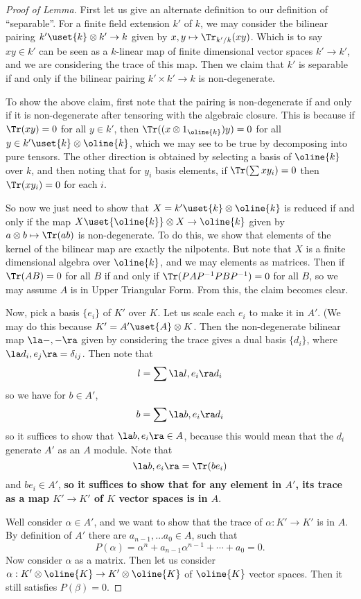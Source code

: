 \documentclass[12 pt]{article}
\theoremstyle{definition}
\renewcommand{\(}{\left(}
\renewcommand{\)}{\right)}
\begin{document}
\begin{proof}[Proof of Lemma]

First let us give an alternate definition to our definition of ``separable''. For a finite field extension $k'$ of $k$, we may consider the bilinear pairing $k' \uset{k}\otimes k' \to k$ given by $x,y \mapsto \Tr_{k'/k}(xy)$. Which is to say $xy \in k'$ can be seen as a $k$-linear map of finite dimensional vector spaces $k' \to k'$, and we are considering the trace of this map. Then we claim that $k'$ is separable if and only if the bilinear pairing $k' \times k' \to k$ is non-degenerate.

To show the above claim, first note that the pairing is non-degenerate if and only if it is non-degenerate after tensoring with the algebraic closure. This is because if $\Tr(xy)=0$ for all $y \in k'$, then $\Tr((x\otimes 1_{\oline{k}})y)=0$ for all $y \in k' \uset{k}\otimes \oline{k}$, which we may see to be true by decomposing into pure tensors. The other direction is obtained by selecting a basis of $\oline{k}$ over $k$, and then noting that for $y_i$ basis elements, if $\Tr(\sum x y_i)=0$ then $\Tr(xy_i)=0$ for each $i$. 

So now we just need to show that $X=k' \uset{k} \otimes \oline{k}$ is reduced if and only if the map $X \uset{\oline{k}}\otimes X \to \oline{k}$ given by $a \otimes b \mapsto \Tr(ab)$ is non-degenerate. To do this, we show that elements of the kernel of the bilinear map are exactly the nilpotents. But note that $X$ is a finite dimensional algebra over $\oline{k}$, and we may elements as matrices. Then if $\Tr(AB)=0$ for all $B$ if and only if $\Tr(PAP^{-1}PBP^{-1})=0$ for all $B$, so we may assume $A$ is in Upper Triangular Form. From this, the claim becomes clear.


Now, pick a basis $\{e_i\}$ of $K'$ over $K$. Let us scale each $e_i$ to make it in  $A'$. (We may do this because $K'=A' \uset{A}\otimes K$. Then the non-degenerate bilinear map $\la - , - \ra$ given by considering the trace gives a dual basis $\{d_i\}$, where $\la d_i, e_j \ra=\delta_{ij}$. Then note that
\[l=\sum \la l, e_i \ra d_i\]
so we have for $b \in A'$,
\[b= \sum \la b, e_i \ra d_i\]
so it suffices to show that $\la b, e_i \ra \in A$, because this would mean that the $d_i$ generate $A'$ as an $A$ module. Note that
\[\la b, e_i \ra=\Tr(be_i)\]
and $be_i \in A'$, \textbf{so it suffices to show that for any element in $A'$, its trace as a map $K' \to K'$ of $K$ vector spaces is in $A$}.

Well consider $\alpha \in A'$, and we want to show that the trace of $\alpha:K' \to K'$ is in $A$. By definition of $A'$ there are $a_{n-1}, \ldots a_0 \in A$, such that
\[P(\alpha)=\alpha^n+a_{n-1}\alpha^{n-1}+ \cdots +a_0=0.\]
Now consider $\alpha$ as a matrix. Then let us consider $\alpha:K' \otimes \oline{K} \to K' \otimes \oline{K}$ of $\oline{K}$ vector spaces. Then it still satisfies $P(\beta)=0$.


\end{proof}
\end{document}
